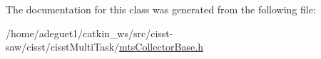 The documentation for this class was generated from the following file\-:\begin{DoxyCompactItemize}
\item 
/home/adeguet1/catkin\-\_\-ws/src/cisst-\/saw/cisst/cisst\-Multi\-Task/\hyperlink{mts_collector_base_8h}{mts\-Collector\-Base.\-h}\end{DoxyCompactItemize}
